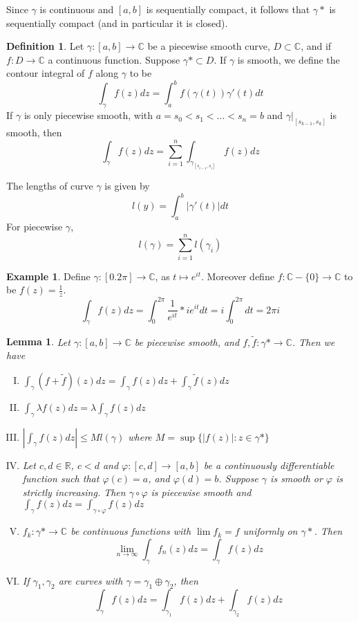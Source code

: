 \documentclass[11pt]{article}
\theoremstyle{plain}
\newtheorem{lemma}[theorem]{Lemma}
\theoremstyle{definition}
\newtheorem{definition}[theorem]{Definition}
\newtheorem{example}[theorem]{Example}
\begin{document}
\vspace{5mm}
\noindent

Since $\gamma$ is continuous and $[a,b]$ is sequentially compact, it follows that $\gamma*$ is sequentially compact (and in particular it is closed).

\begin{definition}
Let $\gamma :[a,b] \to \mathbb{C}$ be a piecewise smooth curve, $D \subset \mathbb{C}$, and if $f: D\to\mathbb{C}$ a continuous function. Suppose $\gamma* \subset D$. If $\gamma$ is smooth, we define the contour integral of $f$ along $\gamma$ to be 
$$ \int_{\gamma} f(z)dz = \int_a^b f(\gamma(t))\gamma'(t)dt $$
If $\gamma$ is only piecewise smooth, with $a = s_0 < s_1 < ... < s_n = b$ and $\gamma|_{[s_{k-1}, s_k]}$ is smooth, then 
$$ \int_{\gamma} f(z)dz = \sum_{i=1}^{n} \int_{\gamma_{[s_{i-1}, s_i]}}f(z)dz $$
\end{definition}

The lengths of curve $\gamma$ is given by 
$$ l(y) = \int_a^b |\gamma'(t)|dt $$
For piecewise $\gamma$,
$$ l(\gamma) = \sum_{i=1}^{n} l(\gamma_i) $$

\begin{example}
Define $\gamma:[0. 2\pi] \to \mathbb{C}$, as $t \mapsto e^{it}$. Moreover define $f: \mathbb{C}- \{0\} \to \mathbb{C}$ to be $f(z) = \frac{1}{z}$. 
$$ \int_{\gamma} f(z)dz = \int_0^{2\pi} \frac{1}{e^{it}} * ie^{it}dt = i \int_0^{2\pi}dt = 2\pi i $$
\end{example}

\begin{lemma} 
Let $\gamma:[a,b] \to \mathbb{C}$ be piecewise smooth, and $f, \tilde{f}:\gamma* \to \mathbb{C}$. Then we have 
\begin{enumerate}[(I)] 
\item $\int_{\gamma} (f + \tilde{f})(z)dz = \int_{\gamma} f(z)dz + \int_{\gamma} \tilde{f}(z)dz $
\item $\int_{\gamma} \lambda f(z)dz = \lambda \int_{\gamma}f(z)dz $
\item $|\int_{\gamma} f(z)dz | \leq Ml(\gamma)$ where $M = \sup\{|f(z)|: z \in \gamma*\}$
\item Let $c, d \in \mathbb{R}$, $c<d$ and $\varphi:[c,d] \to [a,b]$ be a continuously differentiable function such that $\varphi(c) = a$, and $\varphi(d) = b$. Suppose $\gamma$ is smooth or $\varphi$ is strictly increasing. Then $\gamma \circ \varphi$ is piecewise smooth and $\int_{\gamma}f(z)dz = \int_{\gamma \circ \varphi} f(z)dz$
\item $f_k:\gamma* \to \mathbb{C}$ be continuous functions with $\lim f_k = f$ uniformly on $\gamma*$. Then 
$$ \lim_{n \to \infty} \int_{\gamma}f_n(z)dz = \int_{\gamma} f(z)dz $$
\item If $\gamma_1, \gamma_2$ are curves with $\gamma = \gamma_1 \oplus \gamma_2$, then 
$$ \int_{\gamma} f(z)dz = \int_{\gamma_1} f(z)dz + \int_{\gamma_2}f(z)dz $$
\end{enumerate} 
\end{lemma}
\end{document}
